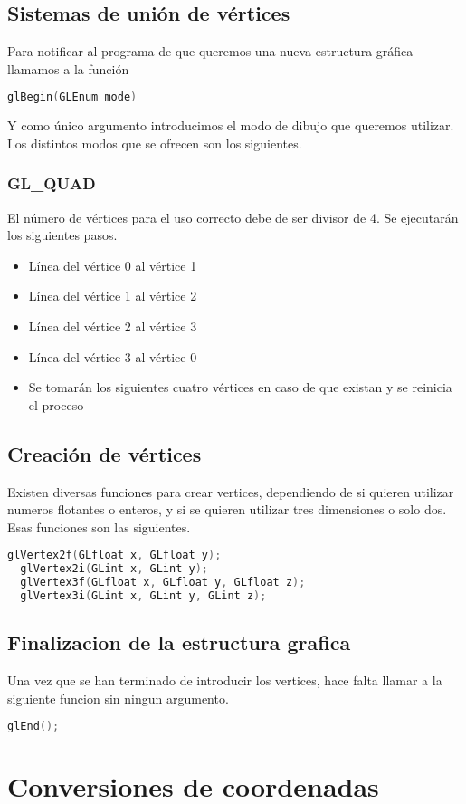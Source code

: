 \documentclass{report}
\begin{document}
\subsection{Sistemas de unión de vértices}
Para notificar al programa de que queremos una nueva estructura gráfica llamamos a la función
\begin{lstlisting}[language=C]
  glBegin(GLEnum mode)
\end{lstlisting}
Y como único argumento introducimos el modo de dibujo que queremos utilizar. Los distintos modos que se ofrecen son los siguientes.
\subsubsection{GL\_QUAD}
El número de vértices para el uso correcto debe de ser divisor de 4. Se ejecutarán los siguientes pasos.
\begin{itemize}
  \item{Línea del vértice 0 al vértice 1}
  \item{Línea del vértice 1 al vértice 2}
  \item{Línea del vértice 2 al vértice 3}
  \item{Línea del vértice 3 al vértice 0}
    \item{Se tomarán los siguientes cuatro vértices en caso de que existan y se reinicia el proceso}
\end{itemize}
\subsection{Creación de vértices}
Existen diversas funciones para crear vertices, dependiendo de si quieren utilizar numeros flotantes o enteros, y si se quieren utilizar tres dimensiones o solo dos. Esas funciones son las siguientes.
\begin{lstlisting}[language=C]
  glVertex2f(GLfloat x, GLfloat y);
  glVertex2i(GLint x, GLint y);
  glVertex3f(GLfloat x, GLfloat y, GLfloat z);
  glVertex3i(GLint x, GLint y, GLint z);
\end{lstlisting}
\subsection{Finalizacion de la estructura grafica}
Una vez que se han terminado de introducir los vertices, hace falta llamar a la siguiente funcion sin ningun argumento.
\begin{lstlisting}[language=C]
  glEnd();
\end{lstlisting}
\section{Conversiones de coordenadas}
\end{document}
